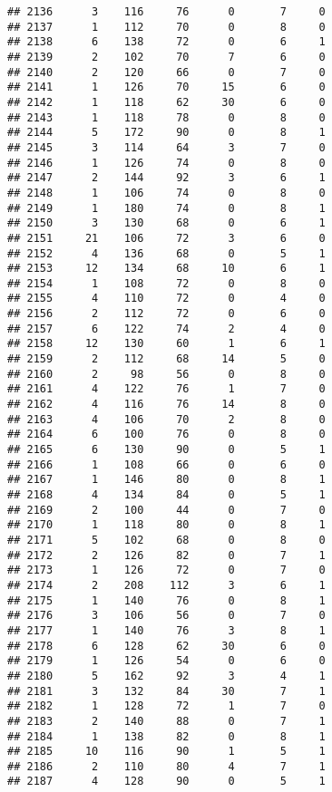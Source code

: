 \documentclass[
]{article}
\begin{document}
\begin{verbatim}
## 2136      3    116     76      0       7     0
## 2137      1    112     70      0       8     0
## 2138      6    138     72      0       6     1
## 2139      2    102     70      7       6     0
## 2140      2    120     66      0       7     0
## 2141      1    126     70     15       6     0
## 2142      1    118     62     30       6     0
## 2143      1    118     78      0       8     0
## 2144      5    172     90      0       8     1
## 2145      3    114     64      3       7     0
## 2146      1    126     74      0       8     0
## 2147      2    144     92      3       6     1
## 2148      1    106     74      0       8     0
## 2149      1    180     74      0       8     1
## 2150      3    130     68      0       6     1
## 2151     21    106     72      3       6     0
## 2152      4    136     68      0       5     1
## 2153     12    134     68     10       6     1
## 2154      1    108     72      0       8     0
## 2155      4    110     72      0       4     0
## 2156      2    112     72      0       6     0
## 2157      6    122     74      2       4     0
## 2158     12    130     60      1       6     1
## 2159      2    112     68     14       5     0
## 2160      2     98     56      0       8     0
## 2161      4    122     76      1       7     0
## 2162      4    116     76     14       8     0
## 2163      4    106     70      2       8     0
## 2164      6    100     76      0       8     0
## 2165      6    130     90      0       5     1
## 2166      1    108     66      0       6     0
## 2167      1    146     80      0       8     1
## 2168      4    134     84      0       5     1
## 2169      2    100     44      0       7     0
## 2170      1    118     80      0       8     1
## 2171      5    102     68      0       8     0
## 2172      2    126     82      0       7     1
## 2173      1    126     72      0       7     0
## 2174      2    208    112      3       6     1
## 2175      1    140     76      0       8     1
## 2176      3    106     56      0       7     0
## 2177      1    140     76      3       8     1
## 2178      6    128     62     30       6     0
## 2179      1    126     54      0       6     0
## 2180      5    162     92      3       4     1
## 2181      3    132     84     30       7     1
## 2182      1    128     72      1       7     0
## 2183      2    140     88      0       7     1
## 2184      1    138     82      0       8     1
## 2185     10    116     90      1       5     1
## 2186      2    110     80      4       7     1
## 2187      4    128     90      0       5     1

\end{verbatim}
\end{document}
